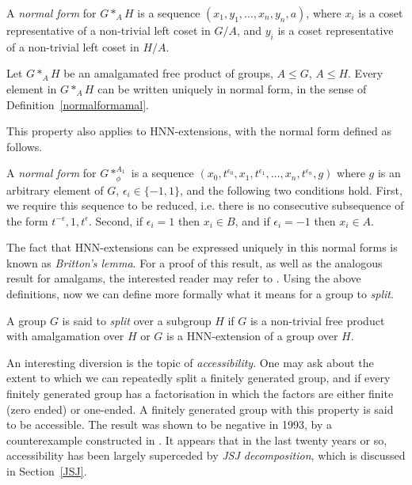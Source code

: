 \begin{definition}
\label{normalformamal}
    A \emph{normal form} for \(G *_A H\) is a sequence \((x_1, y_1, \dots,x_n, y_n, a)\), where \(x_i\) is a coset representative of a non-trivial left coset in \(G/A\), and \(y_i\) is a coset representative of a non-trivial left coset in \(H/A\).
\end{definition}

\begin{lemma}
    Let \(G *_A H\) be an amalgamated free product of groups, \(A \leq G\), \(A \leq H\). Every element in \(G *_A H\) can be written uniquely in normal form, in the sense of Definition~\ref{normalformamal}. 
\end{lemma}

This property also applies to HNN-extensions, with the normal form defined as follows.

\begin{definition}
\label{normalformhnn}
    A \emph{normal form} for \(G \ast_\phi^{A_1}\) is a sequence \((x_0, t^{\epsilon_0}, x_1, t^{\epsilon_1}, \dots, x_n, t^{\epsilon_n}, g)\) where \(g\) is an arbitrary element of \(G\), \(\epsilon_i \in \{-1, 1\}\), and the following two conditions hold. First, we require this sequence to be reduced, i.e. there is no consecutive subsequence of the form \(t^{-\epsilon}, 1, t^{\epsilon}\). Second, if \(\epsilon_i =1\) then \(x_i \in B\), and if \(\epsilon_i = -1\) then \(x_i \in A\).
\end{definition}

The fact that HNN-extensions can be expressed uniquely in this normal forms is known as \emph{Britton's lemma}. For a proof of this result, as well as the analogous result for amalgams, the interested reader may refer to \cite[p.7--8]{K10}. Using the above definitions, now we can define more formally what it means for a group to \emph{split}.

\begin{definition}[Splitting]
    A group \(G\) is said to \emph{split} over a subgroup \(H\) if \(G\) is a non-trivial free product with amalgamation over \(H\) or \(G\) is a HNN-extension of a group over \(H\). 
\end{definition}

\begin{aside}
    An interesting diversion is the topic of \emph{accessibility}. One may ask about the extent to which we can repeatedly split a finitely generated group, and if every finitely generated group has a factorisation in which the factors are either finite (zero ended) or one-ended. A finitely generated group with this property is said to be accessible. The result was shown to be negative in 1993, by a counterexample constructed in \cite{D93}. It appears that in the last twenty years or so, accessibility has been largely superceded by \emph{JSJ decomposition}, which is discussed in Section~\ref{JSJ}. 
\end{aside}

